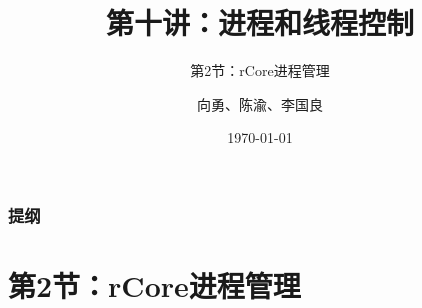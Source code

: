 



\title[第10讲]{第十讲：进程和线程控制} %
\subtitle{第2节：rCore进程管理}
\author{向勇、陈渝、李国良} %
\date{\today} %



\begin{frame}
\titlepage %
\end{frame}
\begin{frame}
\frametitle{提纲} %
\tableofcontents %
\end{frame}
\section{第2节：rCore进程管理}%
% 
